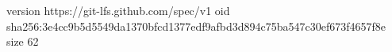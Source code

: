 version https://git-lfs.github.com/spec/v1
oid sha256:3e4cc9b5d5549da1370bfcd1377edf9afbd3d894c75ba547c30ef673f4657f8e
size 62

